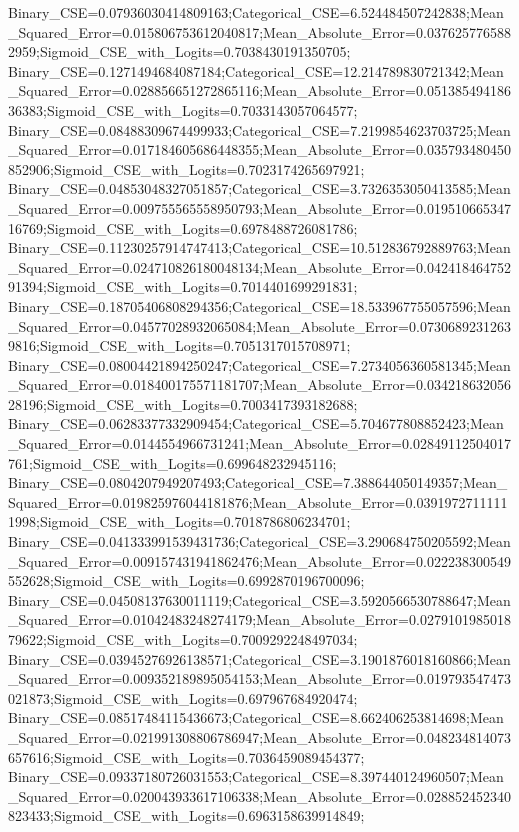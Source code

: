 Binary_CSE=0.07936030414809163;Categorical_CSE=6.524484507242838;Mean_Squared_Error=0.015806753612040817;Mean_Absolute_Error=0.0376257765882959;Sigmoid_CSE_with_Logits=0.7038430191350705;
Binary_CSE=0.1271494684087184;Categorical_CSE=12.214789830721342;Mean_Squared_Error=0.028856651272865116;Mean_Absolute_Error=0.05138549418636383;Sigmoid_CSE_with_Logits=0.7033143057064577;
Binary_CSE=0.08488309674499933;Categorical_CSE=7.2199854623703725;Mean_Squared_Error=0.017184605686448355;Mean_Absolute_Error=0.035793480450852906;Sigmoid_CSE_with_Logits=0.7023174265697921;
Binary_CSE=0.04853048327051857;Categorical_CSE=3.7326353050413585;Mean_Squared_Error=0.009755565558950793;Mean_Absolute_Error=0.01951066534716769;Sigmoid_CSE_with_Logits=0.6978488726081786;
Binary_CSE=0.11230257914747413;Categorical_CSE=10.512836792889763;Mean_Squared_Error=0.024710826180048134;Mean_Absolute_Error=0.04241846475291394;Sigmoid_CSE_with_Logits=0.7014401699291831;
Binary_CSE=0.18705406808294356;Categorical_CSE=18.533967755057596;Mean_Squared_Error=0.04577028932065084;Mean_Absolute_Error=0.07306892312639816;Sigmoid_CSE_with_Logits=0.7051317015708971;
Binary_CSE=0.08004421894250247;Categorical_CSE=7.2734056360581345;Mean_Squared_Error=0.018400175571181707;Mean_Absolute_Error=0.03421863205628196;Sigmoid_CSE_with_Logits=0.7003417393182688;
Binary_CSE=0.06283377332909454;Categorical_CSE=5.704677808852423;Mean_Squared_Error=0.0144554966731241;Mean_Absolute_Error=0.02849112504017761;Sigmoid_CSE_with_Logits=0.699648232945116;
Binary_CSE=0.0804207949207493;Categorical_CSE=7.388644050149357;Mean_Squared_Error=0.019825976044181876;Mean_Absolute_Error=0.03919727111111998;Sigmoid_CSE_with_Logits=0.7018786806234701;
Binary_CSE=0.041333991539431736;Categorical_CSE=3.290684750205592;Mean_Squared_Error=0.009157431941862476;Mean_Absolute_Error=0.022238300549552628;Sigmoid_CSE_with_Logits=0.6992870196700096;
Binary_CSE=0.04508137630011119;Categorical_CSE=3.5920566530788647;Mean_Squared_Error=0.01042483248274179;Mean_Absolute_Error=0.027910198501879622;Sigmoid_CSE_with_Logits=0.7009292248497034;
Binary_CSE=0.03945276926138571;Categorical_CSE=3.1901876018160866;Mean_Squared_Error=0.009352189895054153;Mean_Absolute_Error=0.019793547473021873;Sigmoid_CSE_with_Logits=0.697967684920474;
Binary_CSE=0.08517484115436673;Categorical_CSE=8.662406253814698;Mean_Squared_Error=0.021991308806786947;Mean_Absolute_Error=0.048234814073657616;Sigmoid_CSE_with_Logits=0.7036459089454377;
Binary_CSE=0.09337180726031553;Categorical_CSE=8.397440124960507;Mean_Squared_Error=0.020043933617106338;Mean_Absolute_Error=0.028852452340823433;Sigmoid_CSE_with_Logits=0.6963158639914849;
